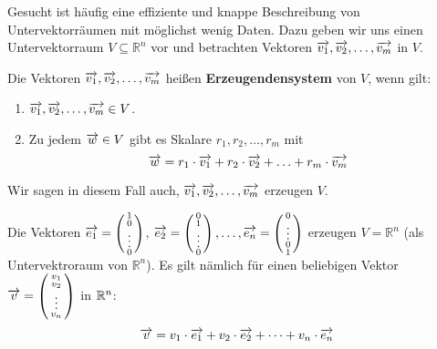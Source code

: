 Gesucht ist häufig eine effiziente und knappe Beschreibung von Untervektorräumen mit möglichst wenig Daten. 
Dazu geben wir uns einen Untervektorraum 
$V \subseteq \mathbb R^n $ vor und betrachten Vektoren $\overrightarrow{v_1}, \overrightarrow{v_2}, \ldots, 
\overrightarrow{v_m}$ in $V$.

\begin{definition} Die Vektoren $\overrightarrow{v_1}, \overrightarrow{v_2}, \ldots, 
\overrightarrow{v_m}$ heißen  \textbf{Erzeugendensystem} von $V$, 
wenn gilt:

\begin{enumerate}
\item $\overrightarrow{v_1}, \overrightarrow{v_2}, \ldots, \overrightarrow{v_m} \in V$.
\item Zu jedem $\overrightarrow{w} \in V$ gibt es Skalare $r_1, r_2, \ldots,  r_m$ mit
  	$$  \overrightarrow{w} = r_1 \cdot \overrightarrow{v_1} + r_2 \cdot \overrightarrow{v_2} + \ldots + 
      r_m \cdot \overrightarrow{v_m} $$
\end{enumerate}
Wir sagen in diesem Fall auch,  $\overrightarrow{v_1}, \overrightarrow{v_2}, \ldots, 
\overrightarrow{v_m}$ erzeugen $V$.
\end{definition}

\begin{beispiel}\label{erz_standard} Die Vektoren  $\overrightarrow{e_1} = 
\left( \begin{smallmatrix} 1 \\ 0 \\ \vdots \\ 0
\end{smallmatrix} \right)$, $\overrightarrow{e_2} = \left( \begin{smallmatrix} 0 \\ 1 \\ \vdots \\ 0 
\end{smallmatrix} \right), \ldots , \overrightarrow{e_n} = \left( \begin{smallmatrix} 0 \\ \vdots \\ 0 \\ 1 
\end{smallmatrix} \right)$ erzeugen $V = \mathbb R^n$ (als Untervektroraum von $\mathbb R^n$). Es gilt 
nämlich für einen beliebigen Vektor 
$\overrightarrow{v} = \left( \begin{smallmatrix} v_1 \\ v_2 \\ \vdots \\ v_n \end{smallmatrix} \right)$ 
in $\mathbb R^n$:
  	$$ \overrightarrow{v} = v_1 \cdot \overrightarrow{e_1} + v_2 \cdot \overrightarrow{e_2} + \cdots + v_n \cdot \overrightarrow{e_n} $$
\end{beispiel}

